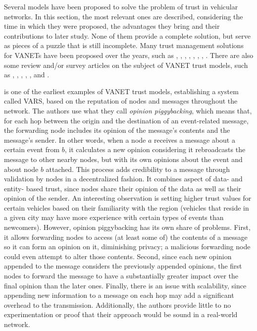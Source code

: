 Several models have been proposed to solve the problem of trust in vehicular networks. 
In this section, the most relevant ones are described, considering the time in which they were proposed, the advantages they bring and their contributions to later study. 
None of them provide a complete solution, but serve as pieces of a puzzle that is still incomplete. 
Many trust management solutions for VANETs have been proposed over the years, such as \citep{patwardhan2006data}, \citep{gerlach2007trust}, \citep{raya2008data}, \citep{huang2010situation}, \citep{ding2013novel}, \citep{haddadou2013trust}, \citep{liu2016lsot}, \citep{kerrache2016detection}.
There are also some review and/or survey articles on the subject of VANET trust models, such as \citep{zhang2011survey}, \citep{ma2011survey}, \citep{zhang2012trust}, \citep{mejri2014survey}, \citep{soleymani2015trust} \citep{sengar2016survey}, and \citep{dwivedi2016review}. 

\citep{dotzer2005vars} is one of the earliest examples of VANET trust models, establishing a system called VARS, based on the reputation of nodes and messages throughout the network.
The authors use what they call \textit{opinion piggybacking}, which means that, for each hop between the origin and the destination of an event-related message, the forwarding node includes its opinion of the message's contents and the message's sender.
In other words, when a node $a$ receives a message about a certain event from $b$, it calculates a new opinion considering  it rebroadcasts the message to other nearby nodes, but with its own opinions about the event and about node $b$ attached.
This process adds credibility to a message through validation by nodes in a decentralized fashion.
It combines aspect of data- and entity- based trust, since nodes share their opinion of the data as well as their opinion of the sender. 
An interesting observation is setting higher trust values for certain vehicles based on their familiarity with the region (vehicles that reside in a given city may have more experience with certain types of events than newcomers).
However, opinion piggybacking has its own share of problems.
First, it allows forwarding nodes to access (at least some of) the contents of a message so it can form an opinion on it, diminishing privacy; a malicious forwarding node could even attempt to alter those contents.
Second, since each new opinion appended to the message considers the previously appended opinions, the first nodes to forward the message to have a substantially greater impact over the final opinion than the later ones.
Finally, there is an issue with scalability, since appending new information to a message on each hop may add a significant overhead to the transmission. Additionally, the authors provide little to no experimentation or proof that their approach would be sound in a real-world network.

